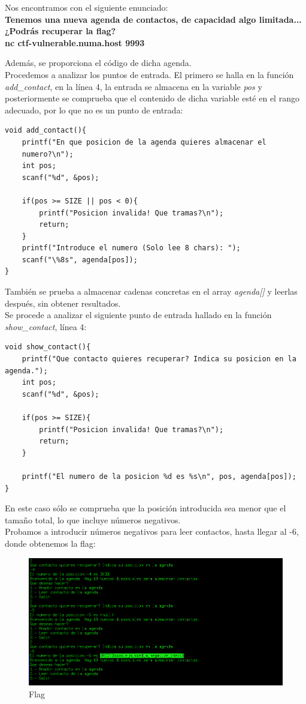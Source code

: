 \documentclass[12pt, a4paper,twoside,titlepage]{article}
\begin{document}
Nos encontramos con el siguiente enunciado:\\

\textbf{Tenemos una nueva agenda de contactos, de capacidad algo limitada... ¿Podrás recuperar la flag?\\
nc ctf-vulnerable.numa.host 9993}

Además, se proporciona el código de dicha agenda.\\

Procedemos a analizar los puntos de entrada. El primero se halla en la función \emph{add\_contact}, en la línea 4, la entrada se almacena en la variable \emph{pos} y posteriormente se comprueba que el contenido de dicha variable esté en el rango adecuado, por lo que no es un punto de entrada:
\begin{verbatim}
void add_contact(){
    printf("En que posicion de la agenda quieres almacenar el 
    numero?\n");
    int pos;
    scanf("%d", &pos);

    if(pos >= SIZE || pos < 0){
        printf("Posicion invalida! Que tramas?\n");
        return;
    }
    printf("Introduce el numero (Solo lee 8 chars): ");
    scanf("\%8s", agenda[pos]);
}
\end{verbatim}

También se prueba a almacenar cadenas concretas en el array \emph{agenda[]} y leerlas después, sin obtener resultados.
\\
Se procede a analizar el siguiente punto de entrada hallado en la función \emph{show\_contact}, línea 4:
\begin{verbatim}
void show_contact(){
    printf("Que contacto quieres recuperar? Indica su posicion en la agenda.");
    int pos;
    scanf("%d", &pos);

    if(pos >= SIZE){
        printf("Posicion invalida! Que tramas?\n");
        return;
    }

    printf("El numero de la posicion %d es %s\n", pos, agenda[pos]);
}
\end{verbatim}

En este caso sólo se comprueba que la posición introducida sea menor que el tamaño total, lo que incluye números negativos.\\
Probamos a introducir números negativos para leer contactos, hasta llegar al -6, donde obtenemos la flag:

\begin{figure}[H]
    \centering
    \includegraphics[width=1\linewidth]{Figuras/Agenda1/Flag.png}
    \caption{Flag}
    \label{fig:my_label}
\end{figure}
\end{document}
